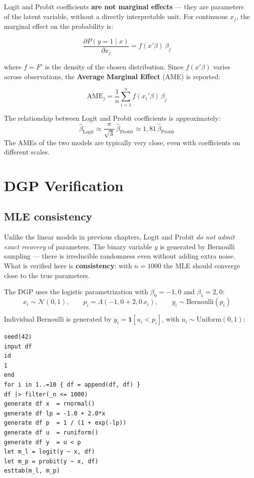 Logit and Probit coefficients \textbf{are not marginal effects} --- they are
parameters of the latent variable, without a directly interpretable unit.
For continuous $x_j$, the marginal effect on the probability is:

\[
  \frac{\partial P(y=1 \mid x)}{\partial x_j}
  = f(x'\beta)\,\beta_j
\]

where $f = F'$ is the density of the chosen distribution. Since $f(x'\beta)$
varies across observations, the \textbf{Average Marginal Effect} (AME) is reported:

\[
  \mathrm{AME}_j = \frac{1}{n}\sum_{i=1}^{n} f(x_i'\beta)\,\beta_j
\]

\begin{nota}
  The relationship between Logit and Probit coefficients is approximately:
  \[
    \hat\beta_{\mathrm{Logit}} \approx \frac{\pi}{\sqrt{3}}\,\hat\beta_{\mathrm{Probit}}
    \approx 1{,}81\,\hat\beta_{\mathrm{Probit}}
  \]
  The AMEs of the two models are typically very close, even with
  coefficients on different scales.
\end{nota}

\section{DGP Verification}

\subsection*{MLE consistency}

Unlike the linear models in previous chapters, Logit and Probit
\emph{do not admit exact recovery} of parameters. The binary variable $y$
is generated by Bernoulli sampling --- there is irreducible randomness even
without adding extra noise. What is verified here is \textbf{consistency}:
with $n=1000$ the MLE should converge close to the true parameters.

The DGP uses the logistic parametrization with $\beta_0 = -1{,}0$ and $\beta_1 = 2{,}0$:
\[
  x_i \sim \mathcal{N}(0,1), \qquad
  p_i = \Lambda(-1{,}0 + 2{,}0\,x_i), \qquad
  y_i \sim \mathrm{Bernoulli}(p_i)
\]

Individual Bernoulli is generated by $y_i = \mathbf{1}[u_i < p_i]$, with
$u_i \sim \mathrm{Uniform}(0,1)$:

\begin{lstlisting}[caption={Logistic DGP --- Logit and Probit simultaneously}]
seed(42)
input df
id
1
end
for i in 1..=10 { df = append(df, df) }
df |> filter(_n <= 1000)
generate df x  = rnormal()
generate df lp = -1.0 + 2.0*x
generate df p  = 1 / (1 + exp(-lp))
generate df u  = runiform()
generate df y  = u < p
let m_l = logit(y ~ x, df)
let m_p = probit(y ~ x, df)
esttab(m_l, m_p)
\end{lstlisting}

